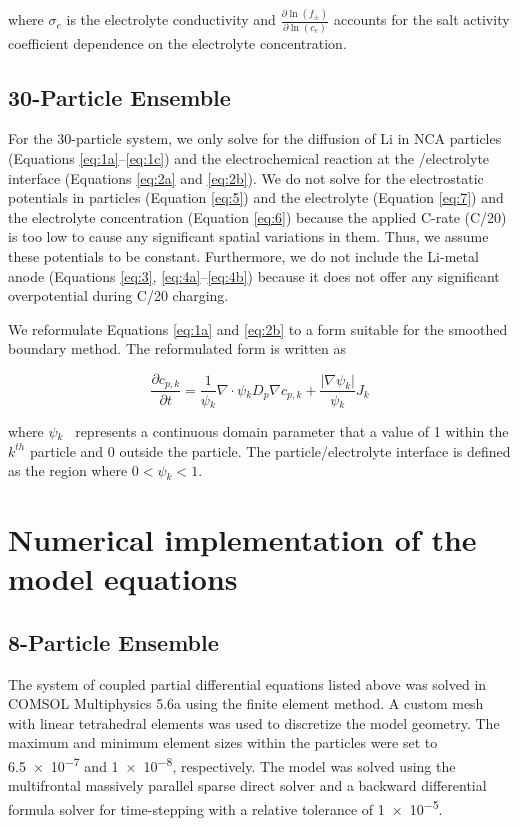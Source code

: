 \documentclass{article}
\begin{document}
where $\sigma_e$ is the electrolyte conductivity and $\frac{\partial
  \ln \left(f_\pm\right)}{\partial \ln \left(c_e\right)}$ accounts for
the salt activity coefficient dependence on the electrolyte
concentration.

\subsection{30-Particle Ensemble}

For the 30-particle system, we only solve for the diffusion of Li in
NCA particles (Equations \ref{eq:1a}--\ref{eq:1c}) and the
electrochemical reaction at the \nca{}/electrolyte interface
(Equations \ref{eq:2a} and \ref{eq:2b}). We do not solve for the
electrostatic potentials in \nca{} particles (Equation \ref{eq:5}) and
the electrolyte (Equation \ref{eq:7}) and the electrolyte
concentration (Equation \ref{eq:6}) because the applied C-rate (C/20)
is too low to cause any significant spatial variations in them. Thus,
we assume these potentials to be constant.  Furthermore, we do not
include the Li-metal anode (Equations \ref{eq:3},
\ref{eq:4a}--\ref{eq:4b}) because it does not offer any significant
overpotential during C/20 charging.

We reformulate Equations \ref{eq:1a} and \ref{eq:2b} to a form suitable
for the smoothed boundary method\cite{thornton2012,thornton2018}. The
reformulated form is written as\cite{thornton2018}

\begin{equation}
  \frac{\partial c_{p,k}}{\partial t}=\frac 1{\psi{}_k}\nabla \cdot \psi{}_kD_p\nabla c_{p,k}+\frac{\left|\nabla \psi{}_k\right|}{\psi{}_k}J_k
  \label{eq:8}
\end{equation}

where $\psi{}_k$ \ represents a continuous domain parameter that a value of
1 within the $k^{\mathit{th}}$ particle and 0 outside the
particle. The particle/electrolyte interface is defined as the region
where $ 0 < \psi{}_k < 1 $.


\section{Numerical implementation of the model equations}

\subsection{8-Particle Ensemble}

The system of coupled partial differential equations listed above was
solved in COMSOL Multiphysics 5.6a using the finite element method. A
custom mesh with linear tetrahedral elements was used to discretize
the model geometry. The maximum and minimum element sizes within the
\nca{} particles were set to \num{6.5e-7} and \num{1e-8},
respectively. The model was solved using the multifrontal massively
parallel sparse direct solver \cite{lexcellent2000} and a backward differential
formula solver for time-stepping with a relative tolerance of
\num{1e-5}.
\end{document}
